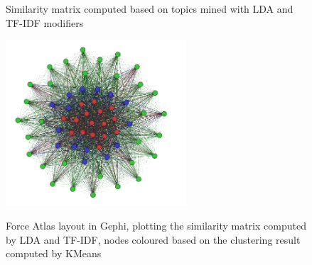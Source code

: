 \documentclass[11pt]{article}
\begin{document}
\begin{figure}[htp!]
  \centering
  \caption{Similarity matrix computed based on topics mined with LDA and TF-IDF modifiers}
\end{figure}

\begin{figure}[htp!]
  \centering
  \includegraphics[width=0.6\textwidth]{./img/topic_tf_idf_force_layout.png}
  \label{fig:topic_tf_idf_force_layout}
  \caption{Force Atlas layout in Gephi, plotting the similarity matrix computed by LDA and TF-IDF, nodes coloured based on the clustering result computed by KMeans}
\end{figure}
\end{document}
